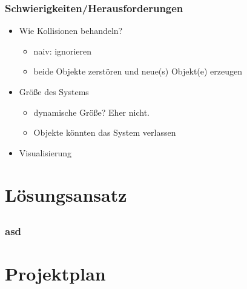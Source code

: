 \documentclass{beamer}
\begin{document}

\begin{frame}
    \frametitle{Schwierigkeiten/Herausforderungen}
    \begin{itemize}
        \item Wie Kollisionen behandeln?
            \begin{itemize}
                \item naiv: ignorieren
                \item beide Objekte zerstören und neue(s) Objekt(e) erzeugen
            \end{itemize}
        \item Größe des Systems
            \begin{itemize}
                \item dynamische Größe? Eher nicht.
                \item Objekte könnten das System verlassen
            \end{itemize}
        \item Visualisierung
    \end{itemize}
\end{frame}


\section{Lösungsansatz}
\subsection{}


\begin{frame}
    \frametitle{asd}
\end{frame}


\section{Projektplan}
\subsection{}

\end{document}
